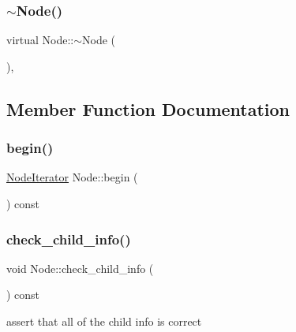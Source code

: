 \mbox{\label{class_node_af5e3fa79300bf5f3f2f3ecae6e795a94}} 
\subsubsection{\texorpdfstring{$\sim$\+Node()}{~Node()}}
{\footnotesize\ttfamily virtual Node\+::$\sim$\+Node (\begin{DoxyParamCaption}{ }\end{DoxyParamCaption})\hspace{0.3cm}{\ttfamily [inline]}, {\ttfamily [virtual]}}



\subsection{Member Function Documentation}
\mbox{\label{class_node_a319b65eca94c9438201ebda99ab90a65}} 
\subsubsection{\texorpdfstring{begin()}{begin()}}
{\footnotesize\ttfamily \hyperlink{class_node_1_1_node_iterator}{Node\+Iterator} Node\+::begin (\begin{DoxyParamCaption}{ }\end{DoxyParamCaption}) const\hspace{0.3cm}{\ttfamily [inline]}}

\mbox{\label{class_node_ab8f9492893b0e2b2d7b3d1819dacc92b}} 
\subsubsection{\texorpdfstring{check\+\_\+child\+\_\+info()}{check\_child\_info()}}
{\footnotesize\ttfamily void Node\+::check\+\_\+child\+\_\+info (\begin{DoxyParamCaption}{ }\end{DoxyParamCaption}) const\hspace{0.3cm}{\ttfamily [inline]}}

assert that all of the child info is correct\mbox{\label{class_node_a23adfa03c20f4141b1105c5b4b1bca3f}} 
